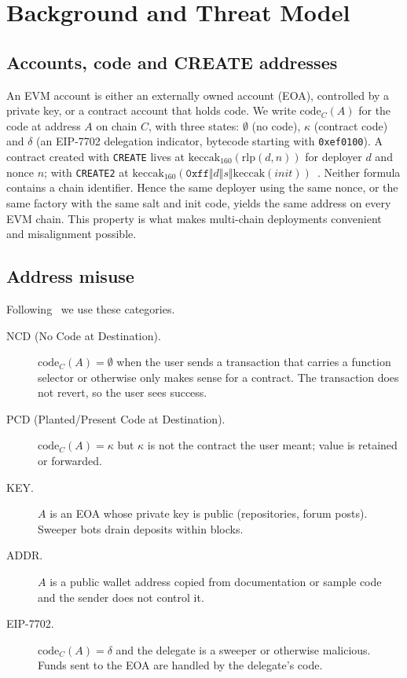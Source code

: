 \documentclass[runningheads]{llncs}
\newcommand{\NCD}{\textsf{NCD}}
\newcommand{\PCD}{\textsf{PCD}}
\newcommand{\code}[2]{\mathrm{code}_{#1}(#2)}
\begin{document}
\section{Background and Threat Model}
\label{sec:background}
\subsection{Accounts, code and CREATE addresses}
An EVM account is either an externally owned account (EOA), controlled by a
private key, or a contract account that holds code. We write $\code{C}{A}$ for
the code at address $A$ on chain $C$, with three states: $\emptyset$ (no code),
$\kappa$ (contract code) and $\delta$ (an EIP-7702 delegation indicator, bytecode
starting with \texttt{0xef0100}). A contract created with \texttt{CREATE} lives at
$\text{keccak}_{160}(\text{rlp}(d,n))$ for deployer $d$ and nonce $n$; with
\texttt{CREATE2} at $\text{keccak}_{160}(\texttt{0xff}\Vert d\Vert s\Vert
\text{keccak}(\mathit{init}))$~\cite{wood2014yellow,eip1014}. Neither formula
contains a chain identifier.
Hence the same deployer using the same nonce, or the same factory with the same
salt and init code, yields the same address on every EVM chain. This property is
what makes multi-chain deployments convenient and misalignment possible.

\subsection{Address misuse}
Following~\cite{shao2026lost} we use these categories.
\begin{description}
\item[\NCD{} (No Code at Destination).] $\code{C}{A}=\emptyset$ when the user
sends a transaction that carries a function selector or otherwise only makes
sense for a contract. The transaction does not revert, so the user sees success.
\item[\PCD{} (Planted/Present Code at Destination).] $\code{C}{A}=\kappa$ but
$\kappa$ is not the contract the user meant; value is retained or forwarded.
\item[KEY.] $A$ is an EOA whose private key is public (repositories, forum
posts). Sweeper bots drain deposits within blocks.
\item[ADDR.] $A$ is a public wallet address copied from documentation or sample
code and the sender does not control it.
\item[EIP-7702.] $\code{C}{A}=\delta$ and the delegate is a sweeper or otherwise
malicious. Funds sent to the EOA are handled by the delegate's code.
\end{description}
\end{document}
